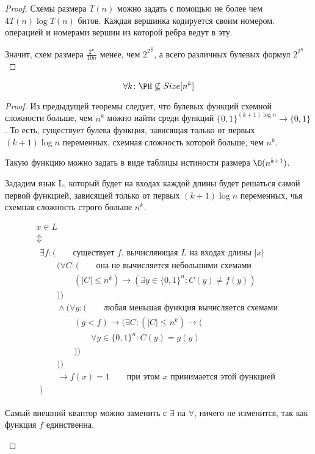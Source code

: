 \begin{proof}
	Схемы размера $T(n)$ можно задать с помощью не более
	чем $4T(n) \log T(n)$  битов. Каждая вершинка кодируется
	своим номером. операцией и номерами вершин из которой ребра ведут в эту. 

	Значит, схем размера $\frac{2^{n}}{10n}$ менее, чем $2^{2^{\frac{n}{2}}}$, 
	а всего различных булевых формул $2^{2^n}$
\end{proof}


\begin{theorem}
	\[ \forall k \colon \PH \not\subseteq Size[n^k] \]
\end{theorem}
\begin{proof}
	Из предыдущей теоремы следует, что булевых функций схемной
	сложности больше, чем $n^k$ можно найти среди функций 
	$\{0, 1\}^{(k + 1)\log n}\to \{0, 1\}$. То есть, существует 
	булева функция, зависящая только от первых $(k + 1)\log n$ 
	переменных, схемная сложность которой больше, чем $n^k$.

	Такую функцию можно задать в виде таблицы истиности размера $\O(n^{k + 1})$.

	Зададим язык L, который будет на входах каждой длины будет 
	решаться самой первой функцией, зависящей только от первых $(k + 1)\log n$
	переменных, чья схемная сложность строго больше $n^k$.
	
	\begin{gather*}
		x \in L \\
		\Updownarrow \\
		\begin{array}{l}
		\exists f \colon ( \qquad\textit{существует $f$, вычисляющая $L$ на входах длины $|x|$} \\
		\qquad	(\forall C \colon ( \qquad \textit{она не вычисляется небольшими схемами} \\
		\qquad	\qquad	(|C| \le n^k) \to (\exists y \in \{0, 1\}^n \colon C(y) \ne f(y)) \\
		\qquad	)) \\
		\qquad	\land (\forall g \colon ( \qquad \textit{любая меньшая функция вычисляется схемами} \\
		\qquad	\qquad	(g < f) \to (\exists C \colon (|C| \le n^k) \to ( \\
		\qquad	\qquad	\qquad	\forall y \in \{0, 1\}^n \colon C(y) = g(y) \\
		\qquad	\qquad	)) \\
		\qquad	)) \\
		\qquad \to f(x) = 1 \qquad \textit{при этом $x$ принимается этой функцией} \\
		)
		\end{array}
	\end{gather*}
	\begin{Rem}
		Самый внешний квантор можно заменить с $\exists$ на $\forall$, ничего не изменится,
		так как функция $f$ единственна.
	\end{Rem}


\end{proof}

